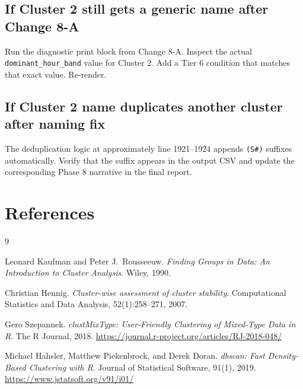 \documentclass[11pt]{article}
\newcommand{\rcode}[1]{\texttt{#1}}
\begin{document}
\subsection{If Cluster 2 still gets a generic name after Change 8-A}

Run the diagnostic print block from Change 8-A. Inspect the actual
\rcode{dominant\_hour\_band} value for Cluster 2. Add a Tier 6 condition
that matches that exact value. Re-render.

\subsection{If Cluster 2 name duplicates another cluster after naming fix}

The deduplication logic at approximately line 1921--1924 appends
\rcode{(S\#)} suffixes automatically. Verify that the suffix appears in
the output CSV and update the corresponding Phase 8 narrative in the
final report.

\section{References}

\begin{thebibliography}{9}

Leonard Kaufman and Peter J.\ Rousseeuw.
\textit{Finding Groups in Data: An Introduction to Cluster Analysis}.
Wiley, 1990.

Christian Hennig.
\textit{Cluster-wise assessment of cluster stability}.
Computational Statistics and Data Analysis, 52(1):258--271, 2007.

Gero Szepannek.
\textit{clustMixType: User-Friendly Clustering of Mixed-Type Data in R}.
The R Journal, 2018.
\url{https://journal.r-project.org/articles/RJ-2018-048/}

Michael Hahsler, Matthew Piekenbrock, and Derek Doran.
\textit{dbscan: Fast Density-Based Clustering with R}.
Journal of Statistical Software, 91(1), 2019.
\url{https://www.jstatsoft.org/v91/i01/}

\end{thebibliography}
\end{document}
